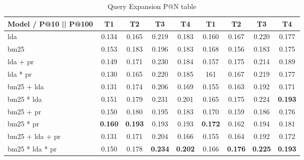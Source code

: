 \begin{table*}[h]
	\centering
	\caption{Query Expansion P@N table}
	\begin{tabular}{l|c|c|c|c||c|c|c|c}
		Model / P@10 || P@100 & T1 & T2 & T3 & T4 & T1 & T2 & T3 & T4\\
		\midrule
		\gls{lda} & 0.134 & 0.165 & 0.219 & 0.183 & 0.160 & 0.167 & 0.220 & 0.177 \\
		\gls{bm25} & 0.153 & 0.183 & 0.196 & 0.183 & 0.168 & 0.156 & 0.183 & 0.175 \\ 
		\gls{lda} + \gls{pr} & 0.149 & 0.171 & 0.230 & 0.184 & 0.157 & 0.175 & 0.214 & 0.189 \\
		\gls{lda} * \gls{pr} & 0.130 & 0.165 & 0.220 & 0.185 & 161 & 0.167 & 0.219 & 0.177 \\
		\gls{bm25} + \gls{lda} & 0.131 & 0.174 & 0.206 & 0.169 & 0.155 & 0.163 & 0.192 & 0.171 \\
		\gls{bm25} * \gls{lda} & 0.151 & 0.179 & 0.231 & 0.201 & 0.165 & 0.175 & 0.224 & \textbf{0.193} \\
		\gls{bm25} + \gls{pr} & 0.150 & 0.180 & 0.195 & 0.183 & 0.170 & 0.159 & 0.186 & 0.176 \\
		\gls{bm25} * \gls{pr} & \textbf{0.160} & \textbf{0.193} & 0.193 & 0.193 & \textbf{0.172} & 0.162 & 0.194 & 0.181 \\
		\gls{bm25} + \gls{lda} + \gls{pr} & 0.131 & 0.171 & 0.204 & 0.166 & 0.155 & 0.164 & 0.192 & 0.172 \\
		\gls{bm25} * \gls{lda} * \gls{pr} & 0.150 & 0.178 & \textbf{0.234} & \textbf{0.202} & 0.166 & \textbf{0.176} & \textbf{0.225} & \textbf{0.193} \\
	\end{tabular}
	\label{tab:expansion_results}
\end{table*}
